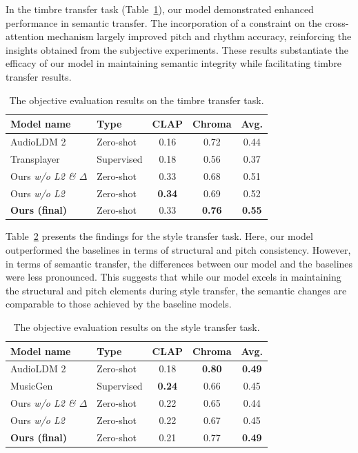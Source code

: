 In the timbre transfer task (Table~\ref{tab:timbre_obj}), our model demonstrated enhanced performance in semantic transfer. The incorporation of a constraint on the cross-attention mechanism largely improved pitch and rhythm accuracy, reinforcing the insights obtained from the subjective experiments. These results substantiate the efficacy of our model in maintaining semantic integrity while facilitating timbre transfer results.

\begin{table}[tb]
\small
    \centering
    \begin{tabular}{l|l|cc|c}
    \toprule
    \textbf{Model name} & \textbf{Type}    &  \textbf{CLAP}  & \textbf{Chroma} & \textbf{Avg.}  \\
    \midrule
    AudioLDM 2 &   Zero-shot & 0.16 & 0.72 & 0.44 \\
    Transplayer & Supervised & 0.18 & 0.56 & 0.37 \\
    \midrule
    Ours \textit{w/o L2 \& $\Delta$} & Zero-shot  & 0.33 & 0.68 & 0.51\\
    Ours \textit{w/o L2} & Zero-shot & \textbf{0.34} & 0.69 & 0.52\\
    \midrule
    \textbf{Ours (final)} & Zero-shot & 0.33 & \textbf{0.76} & \textbf{0.55}\\
    \bottomrule
    \end{tabular}
    \caption{The objective evaluation results on the timbre transfer task.}
    \label{tab:timbre_obj}
\end{table}

Table~\ref{tab:style_obj} presents the findings for the style transfer task. Here, our model outperformed the baselines in terms of structural and pitch consistency. However, in terms of semantic transfer, the differences between our model and the baselines were less pronounced. This suggests that while our model excels in maintaining the structural and pitch elements during style transfer, the semantic changes are comparable to those achieved by the baseline models.

\begin{table}[tb]
\small
    \centering
    \begin{tabular}{l|l|cc|c}
    \toprule
    \textbf{Model name} & \textbf{Type}    &  \textbf{CLAP} & \textbf{Chroma} & \textbf{Avg.} \\
    \midrule
    AudioLDM 2 &   Zero-shot & 0.18 & \textbf{0.80} & \textbf{0.49}\\
    MusicGen & Supervised & \textbf{0.24} & 0.66 & 0.45\\
    \midrule
    Ours \textit{w/o L2 \& $\Delta$} & Zero-shot & 0.22 & 0.65 & 0.44\\
    Ours \textit{w/o L2} & Zero-shot & 0.22 & 0.67 & 0.45\\
    \midrule
    \textbf{Ours (final)} & Zero-shot & 0.21 & 0.77 & \textbf{0.49}\\
    \bottomrule
    \end{tabular}
    \caption{The objective evaluation results on the style transfer task.}
    \label{tab:style_obj}
\end{table}

